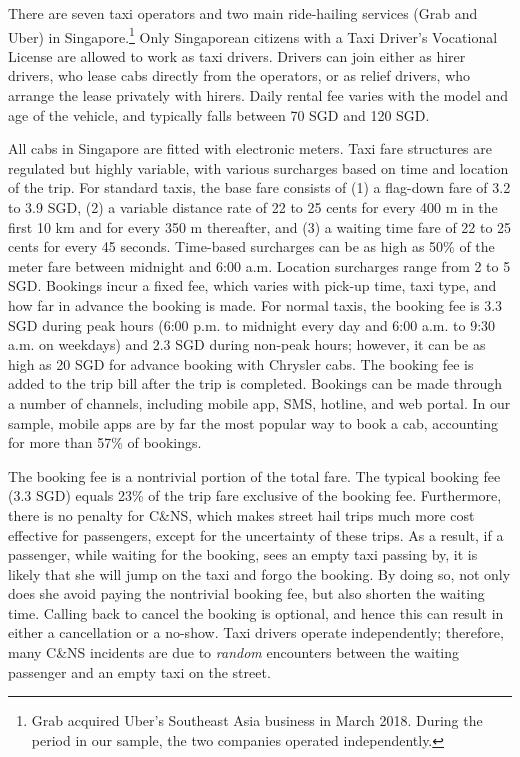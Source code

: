 \documentclass[reviewmode,AEJ]{AEA}
\begin{document}
There are seven taxi operators 
and two main ride-hailing services (Grab and Uber) in Singapore.\footnote{Grab acquired Uber's
Southeast Asia business in March 2018. %
During the period in our sample, the two companies operated independently.} Only Singaporean citizens
with a Taxi Driver's Vocational License are allowed to work as taxi drivers. Drivers can join either 
as hirer drivers, who lease cabs directly from the operators, or as relief drivers, who arrange the 
lease privately with hirers. Daily rental fee varies with the model and age of the vehicle, 
and typically falls between 70 SGD and 120 SGD.

All cabs in Singapore are fitted with electronic meters. Taxi fare structures are regulated but 
highly variable, with various surcharges based on time and location of the trip. 
For standard taxis, the base fare consists of (1) a flag-down fare of 3.2 to 3.9 SGD, 
(2) a variable distance rate of 22 to 25 cents for every 400 m in the first 10 km and for every 350 m thereafter, 
and (3) a waiting time fare of 22 to 25 cents for every 45 seconds. Time-based surcharges can be as high as 50\% 
of the meter fare between midnight and 6:00 a.m. Location surcharges range from 2 to 5 SGD. Bookings incur a fixed
fee, which varies with pick-up time, taxi type, and how far in advance the booking is made. For normal taxis,
the booking fee is 3.3 SGD during peak hours (6:00 p.m. to midnight every day and 6:00 a.m. to 9:30 a.m. 
on weekdays) and 2.3 SGD during non-peak hours; however, it can be as high as 20 SGD for advance booking
with Chrysler cabs. The booking fee is added to the trip bill after the trip is completed. 
Bookings can be made through a number of channels, including mobile app, SMS, hotline, and web portal.
In our sample, mobile apps are by far the most popular way to book a cab, accounting for more than 57\% of bookings.

The booking fee is a nontrivial portion of the total fare. The typical booking fee (3.3 SGD) equals %
 23\% of the trip fare exclusive of the booking fee. Furthermore, there is no penalty for C\&NS, which makes street hail trips 
much more cost effective for passengers, except for the uncertainty of these trips. 
As a result, if a passenger, while waiting for the booking, sees an empty taxi passing by, 
it is likely that she will jump on the taxi and forgo the booking. By doing so, not only does she avoid
paying the nontrivial booking fee, but also shorten the waiting time. Calling back to cancel the booking is optional,
and hence this can result in either a cancellation or a no-show. Taxi drivers operate independently; 
therefore, many C\&NS incidents are due to \textit{random} encounters between the waiting passenger and an
empty taxi on the street.
\end{document}
